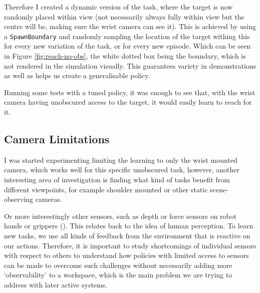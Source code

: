 Therefore I created a dynamic version of the task, where the target is now randomly placed within view (not necessarily always fully within view but the centre will be, making sure the wrist camera can see it). This is achieved by using a \verb|SpawnBoundary| and randomly sampling the location of the target withing this for every new variation of the task, or for every new episode. Which can be seen in Figure \ref{fig:reach-no-obs}, the white dotted box being the boundary, which is not rendered in the simulation visually. This guarantees variety in demonstrations as well as helps us create a generalisable policy.

Running some tests with a tuned  policy, it was enough to see that, with the wrist camera having unobscured access to the target, it would easily learn to reach for it.

\subsection{Camera Limitations}

I was started experimenting limiting the learning to only the wrist mounted camera, which works well for this specific unobscured task, however, another interesting area of investigation is finding what kind of tasks benefit from different viewpoints, for example shoulder mounted or other static scene-observing cameras. 

Or more interestingly other sensors, such as depth or force sensors on robot hands or grippers (). This relates back to the idea of human perception. To learn new tasks, we use all kinds of feedback from the environment that is reactive on our actions. Therefore, it is important to study shortcomings of individual sensors with respect to others to understand how policies with limited access to sensors can be made to overcome such challenges without necessarily adding more `observability' to a workspace, which is the main problem we are trying to address with later active systems.

